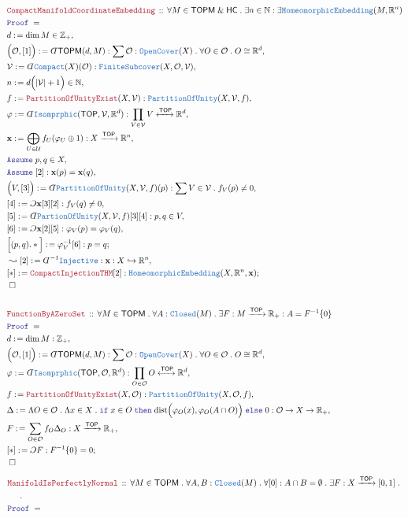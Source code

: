 \documentclass[12pt]{scrartcl}
\newcommand{\TYPE}[1]{\textcolor{NavyBlue}{\mathtt{#1}}}
\newcommand{\LOGIC}[1]{\textcolor{Blue}{\mathtt{#1}}}
\newcommand{\THM}[1]{\textcolor{Maroon}{\mathtt{#1}}}
\renewcommand{\.}{\; . \;}
\newcommand{\de}{: \kern 0.1pc =}
\newcommand{\If}{\LOGIC{if} \;}
\newcommand{\Then}{ \; \LOGIC{then} \;}
\newcommand{\Else}{\; \LOGIC{else} \;}
\newcommand{\Theorem}[2]{& \THM{#1} \, :: \, #2 \\ & \Proof = \\ }
\newcommand{\NewLine}{\\ & \kern 1pc}
\newcommand{\Page}[1]{ \begin{align*} #1 \end{align*}   }
\newcommand{ \bd }{ \ByDef }
\renewcommand{\And}{\; \& \;}
\newcommand{\Int}{\mathbb{Z} }
\newcommand{\Reals}{\mathbb{R} }
\newcommand{\Nat}{\mathbb{N} }
\newcommand{\ToInj}{\hookrightarrow}
\newcommand{\ToIso}{\xleftrightarrow}
\newcommand{\Arrow}{\xrightarrow}
\newcommand{\Say}[3]{& #1 \de #2 : #3, \\}
\newcommand{\SayIn}[3]{& #1 \de #2 \in #3, \\}
\newcommand{\Conclude}[3]{& #1 \de #2 : #3; \\}
\newcommand{\Derive}[3]{& \leadsto #1 \de #2 : #3, \\}
\newcommand{\Assume}[2]{& \LOGIC{Assume} \; #1 : #2, \\}
\newcommand{\AssumeIn}[2]{& \LOGIC{Assume} \; #1 \in #2, \\}
\newcommand{\QED}{\; \square}
\newcommand{\EndProof}{& \QED \\}
\newcommand{\ByDef}{\rotatebox[origin=c]{-180}{$D$}}%
\newcommand{\ByConstr}{\rotatebox[origin=c]{-180}{$C$}}%
\newcommand{\Proof}{\LOGIC{Proof} \; }
\newcommand{\TOP}{\mathsf{TOP}}
\newcommand{\HC}{\mathsf{HC}}
\newcommand{\TOPM}{\mathsf{TOPM}}
\begin{document}
\Page{
	\Theorem{CompactManifoldCoordinateEmbedding}
	{
		\forall M \in \TOPM \And \HC \.
		\exists n \in \Nat :
		\exists \TYPE{HomeomorphicEmbedding}(M,\Reals^n)
	}
	\SayIn{d}{\dim M}{\Int_+}
	\Say{\Big(\mathcal{O},[1]\Big)}{\bd \TOPM(d,M)}
	{
		\sum  \mathcal{O} : \TYPE{OpenCover}(X) \. 
		\forall O \in \mathcal{O} \.
		O \cong  \Reals^d 
	}
	\Say{\mathcal{V}}{\bd \TYPE{Compact}(X)(\mathcal{O})}
	{\TYPE{FiniteSubcover}(X,\mathcal{O},\mathcal{V})}
	\SayIn{n}{d\Big(|\mathcal{V}| + 1\Big)}{\Nat}
	\Say{f}{\THM{PartitionOfUnityExist}(X,\mathcal{V})}
	{
		\TYPE{PartitionOfUnity}(X,\mathcal{V},f)
	}
	\Say{\varphi}{\bd \TYPE{Isomprphic}(\TOP,\mathcal{V},\Reals^{d})}
	{
		\prod_{V \in \mathcal{V}} V \ToIso{\TOP} \Reals^d
	}
	\Say{\mathbf{x}}{ \bigoplus_{U \in \mathcal{U}} f_U(\varphi_U \oplus 1) }
	{
		X \Arrow{\TOP} \Reals^n
	}
	\AssumeIn{p,q}{X}
	\Assume{[2]}{\mathbf{x}(p) = \mathbf{x}(q)}
	\Say{\Big(V,[3]\Big)}{\bd \TYPE{PartitionOfUnity}(X,\mathcal{V},f)(p)}
	{
		\sum V \in \mathcal{V} \. f_V(p) \neq 0
	}
	\Say{[4]}{\ByConstr \mathbf{x}[3][2]}{ f_V(q) \neq 0}
	\Say{[5]}{\bd \TYPE{PartionOfUnity}(X,\mathcal{V},f)[3][4]}
	{
		p,q \in V
	}
	\Say{[6]}{\ByConstr \mathbf{x}[2][5]}{ \varphi_V(p) = \varphi_V(q)}
	\Conclude{\Big[(p,q).*\Big]}{ \varphi^{-1}_V[6] }{p=q}
	\Derive{[2]}{\bd^{-1} \TYPE{Injective}}{\mathbf{x} : X \ToInj \Reals^n}
	\Conclude{[*]}{\THM{CompactInjectionTHM}[2]}{\TYPE{HomeomorphicEmbedding}(X,\Reals^n,\mathbf{x})}
	\EndProof
	\\
	\Theorem{FunctionByAZeroSet}
	{
		\forall M \in \TOPM \.
		\forall A : \TYPE{Closed}(M) \.
		\exists F : M \Arrow{\TOP} \Reals_{+} :
		A = F^{-1}\{0\}
	}
	\Say{d}{\dim M}{\Int_+}
	\Say{\Big(\mathcal{O},[1]\Big)}{\bd \TOPM(d,M)}
	{
		\sum  \mathcal{O} : \TYPE{OpenCover}(X) \. 
		\forall O \in \mathcal{O} \.
		O \cong  \Reals^d 
	}
	\Say{\varphi}{\bd \TYPE{Isomprphic}(\TOP,\mathcal{O},\Reals^{d})}
	{
		\prod_{O \in \mathcal{O}} O \ToIso{\TOP} \Reals^d
	}
	\Say{f}{\THM{PartitionOfUnityExist}(X,\mathcal{O})}
	{
		\TYPE{PartitionOfUnity}(X,\mathcal{O},f)
	}
	\Say{\Delta}{
		\Lambda O \in \mathcal{O} \. 
		\Lambda x \in X \. 
		\If x \in O 
		\Then \mathrm{dist}\Big(\varphi_O(x),\varphi_O(A \cap O) \Big)
		\Else 0 
	}
	{
		\mathcal{O} \to X \to  \Reals_+
	}
	\Say{F}{\sum_{O \in \mathcal{O}}  f_O \Delta_O}{X \Arrow{\TOP} \Reals_+}
	\Conclude{[*]}{\ByConstr F}{F^{-1}\{0\} = 0 }
	\EndProof
}\Page{
	\Theorem{ManifoldIsPerfectlyNormal}
	{
		\forall M \in \TOPM \.
		\forall A,B : \TYPE{Closed}(M) \.
		\forall [0] : A \cap B = \emptyset \. 
		\exists F : X \Arrow{\TOP} [0,1] \. \NewLine \.
}}
\end{document}
